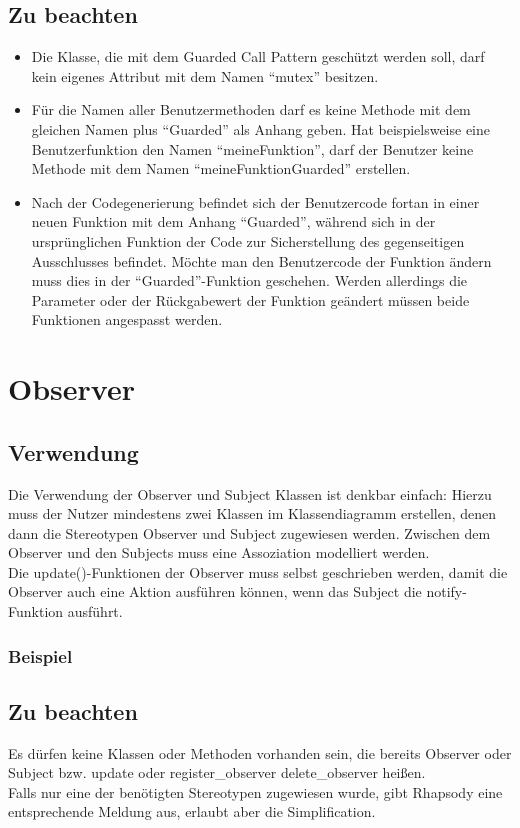 \subsection{Zu beachten}
\begin{itemize}
\item Die Klasse, die mit dem Guarded Call Pattern geschützt werden soll, darf kein eigenes Attribut mit dem Namen \enquote{mutex} besitzen.
\item Für die Namen aller Benutzermethoden darf es keine Methode mit dem gleichen Namen plus \enquote{Guarded} als Anhang geben. Hat beispielsweise eine Benutzerfunktion den Namen \enquote{meineFunktion}, darf der Benutzer keine Methode mit dem Namen \enquote{meineFunktionGuarded} erstellen.
\item Nach der Codegenerierung befindet sich der Benutzercode fortan in einer neuen Funktion mit dem Anhang \enquote{Guarded}, während sich in der ursprünglichen Funktion der Code zur Sicherstellung des gegenseitigen Ausschlusses befindet. Möchte man den Benutzercode der Funktion ändern muss dies in der \enquote{Guarded}-Funktion geschehen. Werden allerdings die Parameter oder der Rückgabewert der Funktion geändert müssen beide Funktionen angespasst werden.
\end{itemize}


\section{Observer}

\subsection{Verwendung}

Die Verwendung der Observer und Subject Klassen ist denkbar einfach: Hierzu muss
der Nutzer mindestens zwei Klassen im Klassendiagramm erstellen, denen dann die
Stereotypen Observer und Subject zugewiesen werden. Zwischen dem Observer und
den Subjects muss eine Assoziation modelliert werden. \\
Die update()-Funktionen der Observer muss selbst geschrieben werden, damit die
Observer auch eine Aktion ausführen können, wenn das Subject die notify-Funktion ausführt.

\subsubsection{Beispiel}

\subsection{Zu beachten}

Es dürfen keine Klassen oder Methoden vorhanden sein, die bereits Observer oder
Subject bzw. update oder register_observer delete_observer heißen.\\

Falls nur eine der benötigten Stereotypen zugewiesen wurde, gibt Rhapsody eine
entsprechende Meldung aus, erlaubt aber die Simplification.\\

